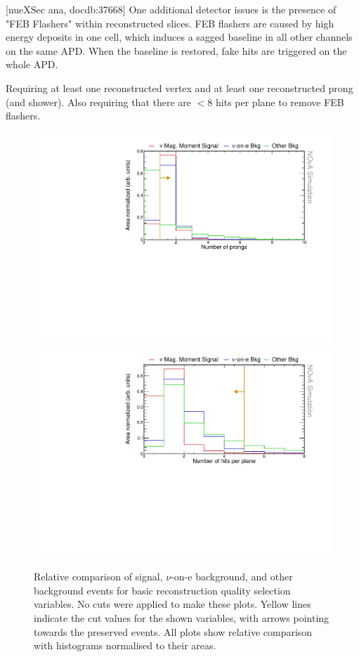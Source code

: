 [nueXSec ana, docdb:37668] One additional detector issues is the presence of "FEB Flashers" within reconstructed slices. FEB flashers are caused by high  energy deposits in one cell, which induces a sagged baseline in all other channels on the same APD. When the baseline is restored, fake hits are triggered on the whole APD.

Requiring at least one reconstructed vertex and at least one reconstructed prong (and shower). Also requiring that there are $<8$ hits per plane to remove FEB flashers.

\begin{figure}[hbtp]
\centering
\includegraphics[width=.75\textwidth]{Plots/NuMMEventSelection/N1Cut_NPng.pdf}
\includegraphics[width=.75\textwidth]{Plots/NuMMEventSelection/N1Cut_NHitsPPlane.pdf}
\caption{Relative comparison of signal, $\nu$-on-e background, and other background events for basic reconstruction quality selection variables. No cuts were applied to make these plots. Yellow lines indicate the cut values for the shown variables, with arrows pointing towards the preserved events. All plots show relative comparison with histograms normalised to their areas.}
\label{fig:NuMMCutsRecoQuality}
\end{figure}

